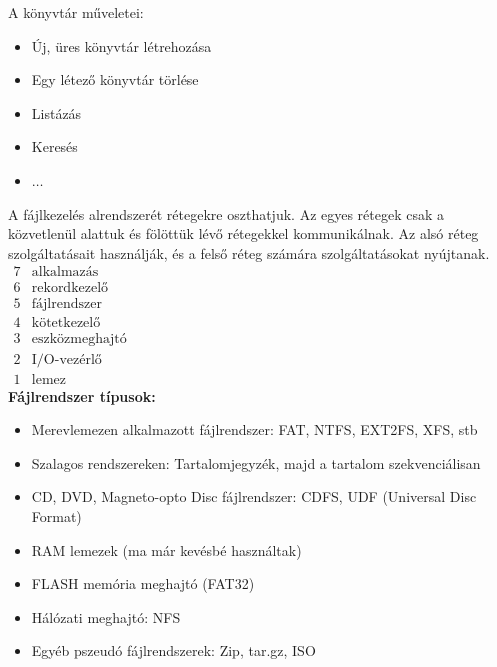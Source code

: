\documentclass[tikz,12pt,margin=0px]{article}
\begin{document}
    \noindent A könyvtár műveletei:
    \begin{itemize}[topsep=8pt,itemsep=4pt,partopsep=4pt, parsep=4pt]
        \item Új, üres könyvtár létrehozása
        \item Egy létező könyvtár törlése
        \item Listázás
        \item Keresés
        \item $\ldots$
    \end{itemize}

    \noindent A fájlkezelés alrendszerét rétegekre oszthatjuk. Az egyes rétegek csak a közvetlenül alattuk és fölöttük lévő rétegekkel kommunikálnak. Az alsó réteg szolgáltatásait használják, és a felső réteg számára szolgáltatásokat nyújtanak.\\

    $\begin{array}{lccc}
      7 & \text{alkalmazás} & &  \\
      6 & \text{rekordkezelő} &  &  \\
      5 & \text{fájlrendszer} &  &  \\
      4 & \text{kötetkezelő} &  &  \\
      3 & \text{eszközmeghajtó} &  &  \\
      2 & \text{I/O-vezérlő} &  &  \\
      1 & \text{lemez} &  &  
    \end{array}$\\


	\noindent \textbf{Fájlrendszer típusok:}
	\begin{itemize}[topsep=8pt,itemsep=4pt,partopsep=4pt, parsep=4pt]
		\item Merevlemezen alkalmazott fájlrendszer: FAT, NTFS, EXT2FS, XFS, stb
		\item Szalagos rendszereken: Tartalomjegyzék, majd a tartalom szekvenciálisan
		\item CD, DVD, Magneto-opto Disc fájlrendszer: CDFS, UDF (Universal Disc Format)
		\item RAM lemezek (ma már kevésbé használtak)
		\item FLASH memória meghajtó (FAT32)
		\item Hálózati meghajtó: NFS
		\item Egyéb pszeudó fájlrendszerek: Zip, tar.gz, ISO
	\end{itemize}
\end{document}
